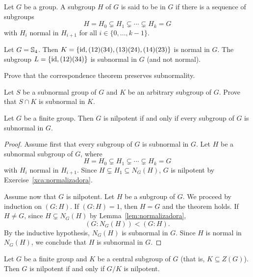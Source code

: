 \begin{definition}
	Let $G$ be a group. A subgroup $H$ of $G$ is said to be  in $G$ if there is a sequence 
    of subgroups 
	\[
		H=H_0\subsetneq H_1\subsetneq\cdots\subsetneq H_k=G		
	\]
	with $H_i$ normal in $H_{i+1}$ for all $i\in\{0,\dots,k-1\}$. 
\end{definition}

\begin{example}
	Let $G=\mathbb{S}_4$. Then $K=\{\operatorname{id},(12)(34),(13)(24),(14)(23)\}$ is normal in $G$. 
	The subgroup $L=\{\operatorname{id},(12)(34)\}$ is subnormal in $G$ (and not normal). 
\end{example}

\begin{exercise}
\label{xca:correspondence_subnormality}
    Prove that the correspondence theorem preserves subnormality. 
\end{exercise}

\begin{exercise}
\label{xca:subnormal_intersection}
    Let $S$ be a subnormal group of $G$ and $K$ be an arbitrary subgroup of $G$. 
    Prove that $S\cap K$ is subnormal in $K$. 
\end{exercise}

\begin{theorem}
	\label{thm:subnormal}
	Let $G$ be a finite group. Then $G$ is nilpotent if and only if every subgroup of $G$ is subnormal in $G$. 
\end{theorem}

\begin{proof}
	Assume first that every subgroup of $G$ is subnormal in $G$. Let $H$ be a subnormal subgroup of $G$, where 
	\[
		H=H_0\subsetneq H_1\subsetneq\cdots\subsetneq H_k=G
	\]
	with $H_i$ normal in $H_{i+1}$. Since $H\subsetneq H_1\subseteq N_G(H)$, 
	$G$ is nilpotent by Exercise~\ref{xca:normalizadora}.

	Assume now that $G$ is nilpotent. Let $H$ be a subgroup of $G$.
	We proceed by induction on $(G:H)$. If $(G:H)=1$, then $H=G$ and the theorem holds. If 
	$H\ne G$, since $H\subsetneq N_G(H)$ by Lemma~\ref{lem:normalizadora}, 
	\[
		(G:N_G(H))<(G:H).
	\]
	By the inductive hypothesis, $N_G(H)$ is subnormal in $G$. Since $H$ is 
	normal in $N_G(H)$, we conclude that $H$ is subnormal in $G$.
\end{proof}


\begin{corollary}
	Let $G$ be a finite group and $K$ be a central subgroup of $G$ (that is, $K\subseteq Z(G)$).
	Then $G$ is nilpotent if and only if $G/K$ is nilpotent. 
\end{corollary}

